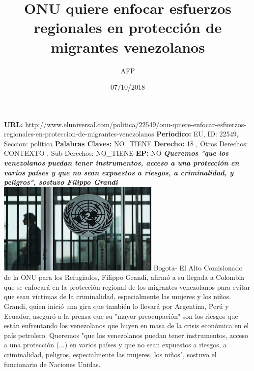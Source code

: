 \documentclass{article}%
\title{\textbf{ONU quiere enfocar esfuerzos regionales en protección de migrantes venezolanos}}%
\author{AFP}%
\date{07/10/2018}%
\begin{document}
%
\normalsize%
\maketitle%
\textbf{URL: }%
http://www.eluniversal.com/politica/22549/onu{-}quiere{-}enfocar{-}esfuerzos{-}regionales{-}en{-}proteccion{-}de{-}migrantes{-}venezolanos\newline%
%
\textbf{Periodico: }%
EU, %
ID: %
22549, %
Seccion: %
politica\newline%
%
\textbf{Palabras Claves: }%
NO\_TIENE\newline%
%
\textbf{Derecho: }%
18%
, Otros Derechos: %
CONTEXTO%
, Sub Derechos: %
NO\_TIENE%
\newline%
%
\textbf{EP: }%
NO\newline%
\newline%
%
\textbf{\textit{Queremos "que los venezolanos puedan tener instrumentos, acceso a una protección en varios países y que no sean expuestos a riesgos, a criminalidad, y peligros", sostuvo Filippo Grandi}}%
\newline%
\newline%
%
\includegraphics[width=300px]{96.jpg}%
\newline%
%
Bogota{-} El Alto Comisionado de la ONU para los Refugiados, Filippo Grandi, afirmó a su llegada a Colombia que se enfocará en la protección regional de los migrantes venezolanos para evitar que sean víctimas de la criminalidad, especialmente las mujeres y los niños.%
\newline%
%
Grandi, quien inició una gira que también lo llevará por Argentina, Perú y Ecuador, aseguró a la prensa que su "mayor preocupación" son los riesgos que están enfrentando los venezolanos que huyen en masa de la crisis económica en el país petrolero.%
\newline%
%
Queremos "que los venezolanos puedan tener instrumentos, acceso a una protección (...) en varios países y que no sean expuestos a riesgos, a criminalidad, peligros, especialmente las mujeres, los niños", sostuvo el funcionario de Naciones Unidas.%
\newline%
\end{document}
